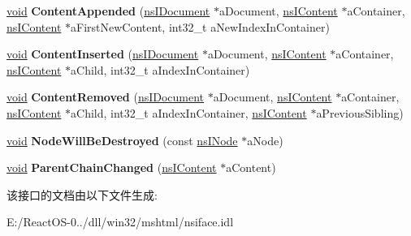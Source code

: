 \begin{DoxyCompactItemize}
\item 
\mbox{\label{interfacens_i_mutation_observer_a3dd424ffd9e7b4d4ef8520453927cbdc}} 
\hyperlink{interfacevoid}{void} {\bfseries Content\+Appended} (\hyperlink{interfacens_i_document}{ns\+I\+Document} $\ast$a\+Document, \hyperlink{interfacens_i_content}{ns\+I\+Content} $\ast$a\+Container, \hyperlink{interfacens_i_content}{ns\+I\+Content} $\ast$a\+First\+New\+Content, int32\+\_\+t a\+New\+Index\+In\+Container)
\item 
\mbox{\label{interfacens_i_mutation_observer_a8942107974750fb36a8a556ece8c7f2d}} 
\hyperlink{interfacevoid}{void} {\bfseries Content\+Inserted} (\hyperlink{interfacens_i_document}{ns\+I\+Document} $\ast$a\+Document, \hyperlink{interfacens_i_content}{ns\+I\+Content} $\ast$a\+Container, \hyperlink{interfacens_i_content}{ns\+I\+Content} $\ast$a\+Child, int32\+\_\+t a\+Index\+In\+Container)
\item 
\mbox{\label{interfacens_i_mutation_observer_a9e4511dfc8b0a23a3e533593f6dde457}} 
\hyperlink{interfacevoid}{void} {\bfseries Content\+Removed} (\hyperlink{interfacens_i_document}{ns\+I\+Document} $\ast$a\+Document, \hyperlink{interfacens_i_content}{ns\+I\+Content} $\ast$a\+Container, \hyperlink{interfacens_i_content}{ns\+I\+Content} $\ast$a\+Child, int32\+\_\+t a\+Index\+In\+Container, \hyperlink{interfacens_i_content}{ns\+I\+Content} $\ast$a\+Previous\+Sibling)
\item 
\mbox{\label{interfacens_i_mutation_observer_a6b88881c97d27c71b7ebd4807751660b}} 
\hyperlink{interfacevoid}{void} {\bfseries Node\+Will\+Be\+Destroyed} (const \hyperlink{interfacens_i_supports}{ns\+I\+Node} $\ast$a\+Node)
\item 
\mbox{\label{interfacens_i_mutation_observer_a1c26e030b9b1495101145a20ae878a6f}} 
\hyperlink{interfacevoid}{void} {\bfseries Parent\+Chain\+Changed} (\hyperlink{interfacens_i_content}{ns\+I\+Content} $\ast$a\+Content)
\end{DoxyCompactItemize}


该接口的文档由以下文件生成\+:\begin{DoxyCompactItemize}
\item 
E\+:/\+React\+O\+S-\/0../dll/win32/mshtml/nsiface.\+idl\end{DoxyCompactItemize}
